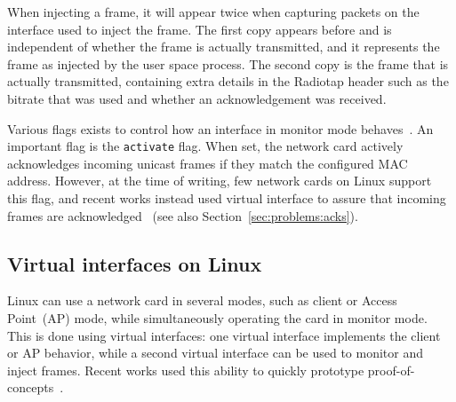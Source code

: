 \documentclass[sigconf]{acmart}
\newcommand{\red}[1]{\textcolor{red}{#1}}
\begin{document}
When injecting a frame, it will appear twice when capturing packets on the interface used to inject the frame.
The first copy appears before and is independent of whether the frame is actually transmitted, and it represents the frame as injected by the user space process.
The second copy is the frame that is actually transmitted, containing extra details in the Radiotap header such as the bitrate that was used and whether an acknowledgement was received.

Various flags exists to control how an interface in monitor mode behaves~\cite{aircrack-iw-flags}.
An important flag is the \verb|activate| flag.
When set, the network card actively acknowledges incoming unicast frames if they match the configured MAC address.
However, at the time of writing, few network cards on Linux support this flag,
and recent works instead used virtual interface to assure that incoming frames are acknowledged~\cite{vanhoef-usenix2021-fragattacks,schepers2021framework}  (see also Section~\ref{sec:problems:acks}).

\subsection{Virtual interfaces on Linux}
\label{sec:back:virtual}

Linux can use a network card in several modes, such as client or Access Point~(AP) mode, while simultaneously operating the card in monitor mode.
This is done using virtual interfaces: one virtual interface implements the client or AP behavior, while a second virtual interface can be used to monitor and inject frames.
Recent works used this ability to quickly prototype proof-of-concepts~\mbox{\cite{vanhoef-usenix2021-fragattacks,schepers2021framework}}.
\end{document}
